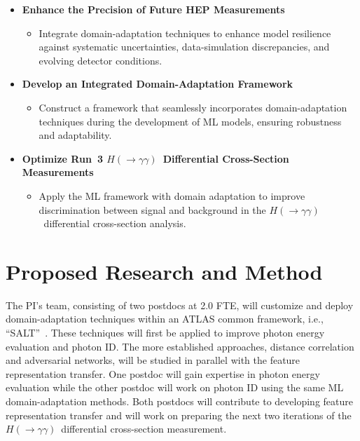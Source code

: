 \documentclass[letter, USenglish, 11pt, subfigure]{article}
\newcommand{\hyy}{\ensuremath{H(\to\gamma\gamma)}}
\begin{document}
\begin{itemize}
  \item \textbf{Enhance the Precision of Future HEP Measurements}
  \begin{itemize}
    \item Integrate domain-adaptation techniques to enhance model resilience against systematic uncertainties, data-simulation discrepancies, and evolving detector conditions.
  \end{itemize}
  
  \item \textbf{Develop an Integrated Domain-Adaptation Framework}
  \begin{itemize}
    \item Construct a framework that seamlessly incorporates domain-adaptation techniques during the development of ML models, ensuring robustness and adaptability.
  \end{itemize}
  
  \item \textbf{Optimize Run~3 \hyy\ Differential Cross-Section Measurements}
  \begin{itemize}
    \item Apply the ML framework with domain adaptation to improve discrimination between signal and background in the \hyy\ differential cross-section analysis.
  \end{itemize}
\end{itemize}
\clearpage
\section{Proposed Research and Method}

The PI's team, consisting of two postdocs at 2.0 FTE, will customize and deploy domain-adaptation techniques within an ATLAS common framework, i.e., ``SALT''~\cite{salt}. These techniques will first be applied to improve photon energy evaluation and photon ID. The more established approaches, distance correlation and adversarial networks, will be studied in parallel with the feature representation transfer. One postdoc will gain expertise in photon energy evaluation while the other postdoc will work on photon ID using the same ML domain-adaptation methods. Both postdocs will contribute to developing feature representation transfer and will work on preparing the next two iterations of the \hyy\ differential cross-section measurement.
\end{document}
